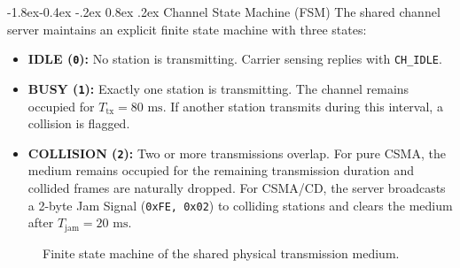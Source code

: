 \documentclass[11pt,a4paper]{article}
\makeatletter
\renewcommand\subsection{\@startsection{subsection}{2}{\z@}%
                                     {-1.8ex\@plus -0.4ex \@minus -.2ex}%
                                     {0.8ex \@plus .2ex}%
                                     {\normalfont\large\bfseries}}
\makeatother
\begin{document}
\subsection{Channel State Machine (FSM)}
The shared channel server maintains an explicit finite state machine with three states:
\begin{itemize}
    \item \textbf{IDLE (\texttt{0}):} No station is transmitting. Carrier sensing replies with \texttt{CH\_IDLE}.
    \item \textbf{BUSY (\texttt{1}):} Exactly one station is transmitting. The channel remains occupied for $T_{\text{tx}} = 80\text{ ms}$. If another station transmits during this interval, a collision is flagged.
    \item \textbf{COLLISION (\texttt{2}):} Two or more transmissions overlap. For pure CSMA, the medium remains occupied for the remaining transmission duration and collided frames are naturally dropped. For CSMA/CD, the server broadcasts a 2-byte Jam Signal (\texttt{0xFE, 0x02}) to colliding stations and clears the medium after $T_{\text{jam}} = 20\text{ ms}$.
\end{itemize}

\begin{figure}[H]
    \centering
    \caption{Finite state machine of the shared physical transmission medium.}
    \label{fig:fsm}
\end{figure}
\end{document}
